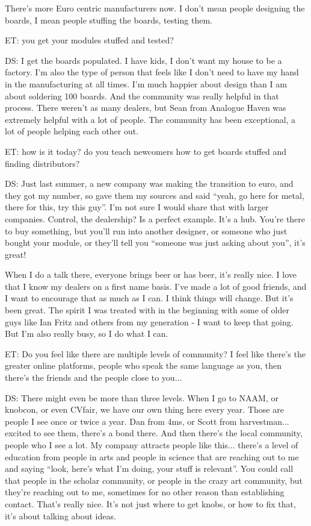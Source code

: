 There's more Euro centric manufacturers now. I don't mean people designing the boards, I mean people stuffing the boards, testing them. 

ET: you get your modules stuffed and tested? 

DS: I get the boards populated. I have kids, I don't want my house to be a factory. I'm also the type of person that feels like I don't need to have my hand in the manufacturing at all times. I'm much happier about design than I am about soldering 100 boards. And the community was really helpful in that process. There weren't as many dealers, but Sean from Analogue Haven was extremely helpful with a lot of people. The community has been exceptional, a lot of people helping each other out. 

ET: how is it today? do you teach newcomers how to get boards stuffed and finding distributors? 

DS: Just last summer, a new company was making the transition to euro, and they got my number, so gave them my sources and said  ``yeah, go here for metal, there for this, try this guy''. I'm not sure I would share that with larger companies. Control, the dealership? Is a perfect example. It's a hub. You're there to buy something, but you'll run into another designer, or someone who just bought your module, or they'll tell you ``someone was just asking about you'', it's great!

When I do a talk there, everyone brings beer or has beer, it's really nice. I love that I know my dealers on a first name basis. I've made a lot of good friends, and I want to encourage that as much as I can. I think things will change. But it's been great. The spirit I was treated with in the beginning with some of older guys like Ian Fritz and others from my generation - I want to keep that going. But I'm also really busy, so I do what I can. 

ET: Do you feel like there are multiple levels of community? I feel like there's the greater online platforms, people who speak the same language as you, then there's the friends and the people close to you...

DS: There might even be more than three levels. When I go to NAAM, or knobcon, or even CVfair, we have our own thing here every year. Those are people I see once or twice a year. Dan from 4ms, or Scott from harvestman... excited to see them, there's a bond there. And then there's the local community, people who I see a lot. My company attracts people like this... there's a level of education from people in arts and people in science that are reaching out to me and saying ``look, here's what I'm doing, your stuff is relevant''. You could call that people in the scholar community, or people in the crazy art community, but they're reaching out to me, sometimes for no other reason than establishing contact. That's really nice. It's not just where to get knobs, or how to fix that, it's about talking about ideas. 


